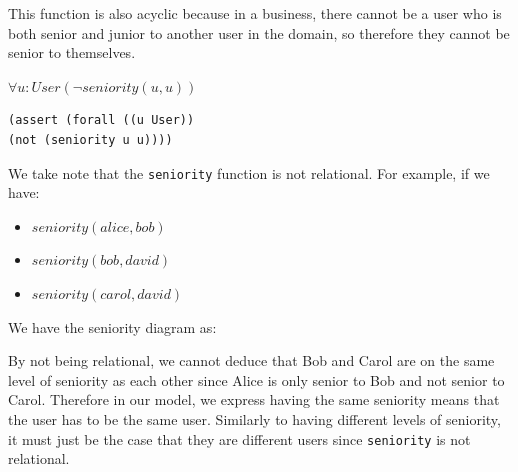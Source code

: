 \documentclass[a4paper]{report}
\begin{document}
This function is also acyclic because in a business, there cannot be a user who is both senior and junior to another user in the domain, so therefore they cannot be senior to themselves.
\begin{center}
$\forall u : User (\neg seniority(u, u))$
\end{center}
\begin{lstlisting}[frame=single]
(assert (forall ((u User))
(not (seniority u u))))
\end{lstlisting}

We take note that the \texttt{seniority} function is not relational. For example, if we have:
\begin{itemize}
\item $seniority(alice, bob)$
\item $seniority(bob, david)$
\item $seniority(carol, david)$
\end{itemize}
We have the seniority diagram as:
\begin{figure}[!h]
\center
{}
\end{figure}

By not being relational, we cannot deduce that Bob and Carol are on the same level of seniority as each other since Alice is only senior to Bob and not senior to Carol. Therefore in our model, we express having the same seniority means that the user has to be the same user. Similarly to having different levels of seniority, it must just be the case that they are different users since \texttt{seniority} is not relational.
\end{document}
